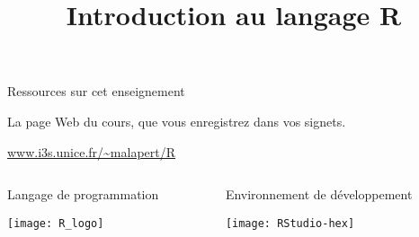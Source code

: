 \documentclass[10pt]{beamer}
\title{Introduction au langage R}
\begin{document}
\maketitle


\begin{frame}{Ressources sur cet enseignement}

  \begin{alertblock}{La page Web du cours, que vous enregistrez dans vos signets.}
    \begin{center}
      \url{www.i3s.unice.fr/~malapert/R}
    \end{center}

  \end{alertblock}
  
\begin{columns}[t]
\begin{column}{0.48\textwidth}
  \begin{block}{Langage de programmation}
    \begin{center}
      \texttt{[image: R\_logo]}
    \end{center}
  \end{block}
\end{column}
\begin{column}{0.51\textwidth}
  \begin{block}{Environnement de développement}
    \begin{center}
      \texttt{[image: RStudio-hex]}          
    \end{center}
  \end{block}
\end{column}
\end{columns}

\end{frame}
\end{document}
